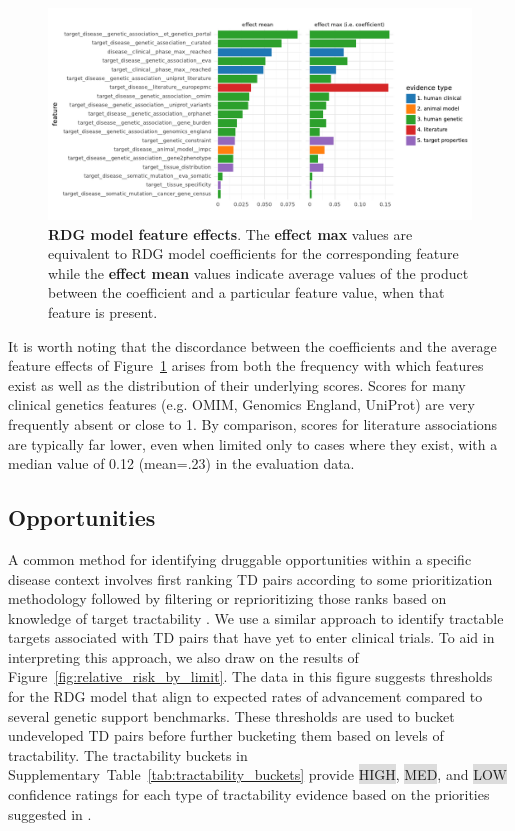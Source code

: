 \documentclass{article}
\begin{document}
\begin{figure}[!htb]
	\centering
  \captionsetup{width=.9\linewidth}
	\includegraphics[width=1\textwidth]{effect_sizes.pdf}
  \caption{
    \textbf{RDG model feature effects}. The \textbf{effect max} values are equivalent to RDG model coefficients for the corresponding feature while the \textbf{effect mean} values indicate average values of the product between the coefficient and a particular feature value, when that feature is present.
  }
	\label{fig:effect_sizes}
\end{figure}

It is worth noting that the discordance between the coefficients and the average feature effects of Figure~\ref{fig:effect_sizes} arises from both the frequency with which features exist as well as the distribution of their underlying scores. Scores for many clinical genetics features (e.g. OMIM, Genomics England, UniProt) are very frequently absent or close to 1. By comparison, scores for literature associations are typically far lower, even when limited only to cases where they exist, with a median value of 0.12 (mean=.23) in the evaluation data.

\subsection{Opportunities}
\label{sec:results_opportunities}

A common method for identifying druggable opportunities within a specific disease context involves first ranking TD pairs according to some prioritization methodology followed by filtering or reprioritizing those ranks based on knowledge of target tractability \cite{PMID:28356508,PMID:35401535,PMID:31253980}. We use a similar approach to identify tractable targets associated with TD pairs that have yet to enter clinical trials. To aid in interpreting this approach, we also draw on the results of Figure~\ref{fig:relative_risk_by_limit}. The data in this figure suggests thresholds for the RDG model that align to expected rates of advancement compared to several genetic support benchmarks. These thresholds are used to bucket undeveloped TD pairs before further bucketing them based on levels of tractability. The tractability buckets in Supplementary~Table~\ref{tab:tractability_buckets} provide \colorbox{Gainsboro}{HIGH}, \colorbox{Gainsboro}{MED}, and \colorbox{Gainsboro}{LOW} confidence ratings for each type of tractability evidence based on the priorities suggested in \cite{OTTractability}.
\end{document}
